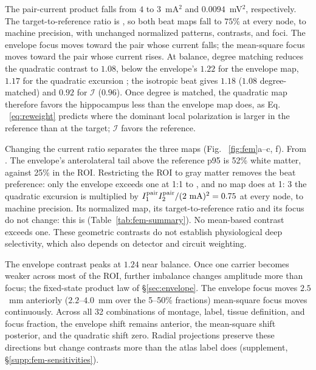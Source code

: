 \documentclass[11pt,a4paper]{article}
\providecommand{\DIFaddtex}[1]{{\protect\color{blue} \sf #1}} %
\providecommand{\DIFdeltex}[1]{{\protect\color{red} \scriptsize #1}} %
\providecommand{\DIFaddbegin}{} %
\providecommand{\DIFaddend}{} %
\providecommand{\DIFdelbegin}{} %
\providecommand{\DIFdelend}{} %
\providecommand{\DIFadd}[1]{\texorpdfstring{\DIFaddtex{#1}}{#1}} %
\providecommand{\DIFdel}[1]{\texorpdfstring{\DIFdeltex{#1}}{}} %
\begin{document}
\DIFadd{The pair-current product falls from $4$ to $3$~mA}\DIFaddend $^2$\DIFdelbegin \DIFdel{and
$0.0094$~mV$^2$, respectively. The target-to-reference ratio is }\DIFdelend \DIFaddbegin \DIFadd{, so both beat maps
fall to $75\%$ at every node, to machine precision, with unchanged normalized
patterns, contrasts, and foci. The envelope focus moves toward the pair whose
current falls; the mean-square focus moves toward the pair whose current rises.
At balance, degree matching reduces the quadratic contrast to $1.08$, below
the envelope's }\DIFaddend $1.22$\DIFdelbegin \DIFdel{for the envelope map, $1.17$ for the quadratic excursion }\DIFdelend \DIFaddbegin \DIFadd{; the isotropic beat gives $1.18$ }\DIFaddend ($1.08$ degree-matched)\DIFdelbegin \DIFdel{and $0.92$ for
$\mathcal I$ ($0.96$).
Once degree is matched,
the quadratic map therefore favors the hippocampus less than the envelope map does, as Eq.
~\eqref{eq:reweight} predicts where
the dominant local polarization is larger in the reference than at the target; $\mathcal I$ favors the reference. }%

\DIFdel{Changing the current ratio separates the three maps (Fig. ~\ref{fig:fem}a--c, f).
From
}\DIFdelend \DIFaddbegin \DIFadd{.
The envelope's anterolateral tail above the reference p95 is 52\% white matter,
against 25\% in the ROI. Restricting the ROI to gray matter removes the beat
preference: only the envelope exceeds one at }\DIFaddend 1:1\DIFdelbegin \DIFdel{to }\DIFdelend \DIFaddbegin \DIFadd{, and no map does at }\DIFaddend 1:\DIFdelbegin \DIFdel{3 the quadratic excursion is multiplied by
$I_1^{\rm pair}I_2^{\rm pair}/(2~\mathrm{mA})^2=0.75$ at every node, to machine
precision. Its normalized map, its target-to-reference ratio and its focus do not change:
this is }\DIFdelend \DIFaddbegin \DIFadd{3
(Table~\ref{tab:fem-summary}). No mean-based contrast exceeds one.
These geometric contrasts do not establish physiological deep selectivity,
which also depends on detector and circuit weighting.
}

\DIFadd{The envelope contrast peaks at $1.24$ near balance. Once one carrier becomes
weaker across most of the ROI, further imbalance changes amplitude more than
focus; }\DIFaddend the \DIFdelbegin \DIFdel{fixed-state product law of \S\ref{sec:envelope}.
The envelope focus moves
$2.5$~mm anteriorly ($2.2$--$4.0$~mm over the 5--50\% fractions)}\DIFdelend \DIFaddbegin \DIFadd{mean-square focus moves continuously. Across all 32 combinations
of montage, label, tissue definition, and focus fraction, the envelope shift
remains anterior, the mean-square shift posterior, and the quadratic shift
zero. Radial projections preserve these directions but change contrasts more
than the atlas label does (supplement, \S\ref{supp:fem-sensitivities}).
}
\end{document}
